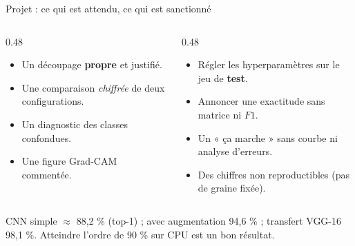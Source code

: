 \begin{frame}{Projet : ce qui est attendu, ce qui est sanctionné}
\begin{columns}[t]
\begin{column}{0.48\textwidth}
\begin{ebox}
\begin{itemize}
  \item Un découpage \textbf{propre} et justifié.
  \item Une comparaison \emph{chiffrée} de deux configurations.
  \item Un diagnostic des classes confondues.
  \item Une figure Grad-CAM commentée.
\end{itemize}
\end{ebox}
\end{column}
\begin{column}{0.48\textwidth}
\begin{wbox}
\begin{itemize}
  \item Régler les hyperparamètres sur le jeu de \textbf{test}.
  \item Annoncer une exactitude sans matrice ni $F1$.
  \item Un « ça marche » sans courbe ni analyse d'erreurs.
  \item Des chiffres non reproductibles (pas de graine fixée).
\end{itemize}
\end{wbox}
\end{column}
\end{columns}
\vspace{1mm}
\begin{kbox}
CNN simple $\approx$ 88,2 \% (top-1) ; avec augmentation 94,6 \% ;
transfert VGG-16 98,1 \%. Atteindre l'ordre de 90 \% sur CPU est un bon résultat.
\end{kbox}
\end{frame}

